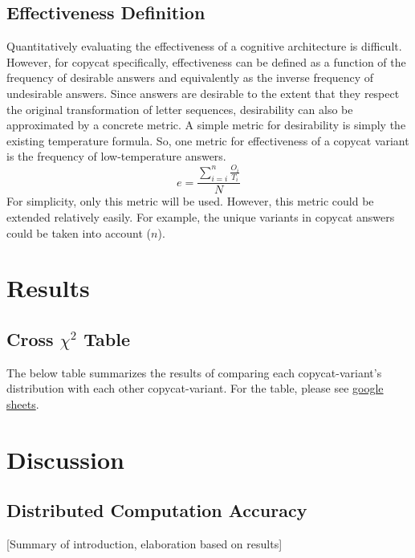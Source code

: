 \documentclass[a4paper]{article}
\begin{document}
    \subsection{Effectiveness Definition}

        Quantitatively evaluating the effectiveness of a cognitive architecture is difficult.
        However, for copycat specifically, effectiveness can be defined as a function of the frequency of desirable answers and equivalently as the inverse frequency of undesirable answers.
        Since answers are desirable to the extent that they respect the original transformation of letter sequences, desirability can also be approximated by a concrete metric.
        A simple metric for desirability is simply the existing temperature formula.
        So, one metric for effectiveness of a copycat variant is the frequency of low-temperature answers.
        $$e = \frac{\sum_{i=i}^{n} \frac{O_i}{T_i}}{N} $$
        For simplicity, only this metric will be used.
        However, this metric could be extended relatively easily.
        For example, the unique variants in copycat answers could be taken into account ($n$).
       
\section{Results}

    \subsection{Cross $\chi^2$ Table}

        The below table summarizes the results of comparing each copycat-variant's distribution with each other copycat-variant.
        For the table, please see \href{"https://docs.google.com/spreadsheets/d/1d4EyEbWLJpLYlE7qSPPb8e1SqCAZUvtqVCd0Ns88E-8/edit?usp=sharing"}{google sheets}.

\section{Discussion}

    \subsection{Distributed Computation Accuracy}

        [Summary of introduction, elaboration based on results]
\end{document}

